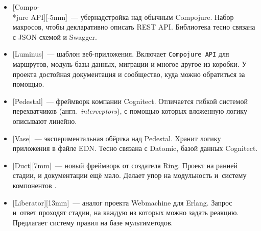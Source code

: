 \begin{itemize}


\item
  [Compo-\\*jure API][-5mm]~---
  убернадстройка над обычным Compojure. Набор макросов, чтобы декларативно описать REST
  API. Библиотека тесно связана с JSON-схемой и Swagger.


\item
  [Luminus]~--- шаблон
  веб-приложения. Включает \texttt{Compojure API} для маршрутов, модуль базы
  данных, миграции и многое другое из коробки. У проекта достойная документация
  и сообщество, куда можно обратиться за помощью.


\item
  [Pedestal]~--- фреймворк
  компании Cognitect. Отличается гибкой системой перехватчиков
  (англ.~\emph{interceptors}), с помощью которых вложенную логику описывают
  линейно.


\item
  [Vase]~---
  экспериментальная обёртка над Pedestal. Хранит логику приложения в файле
  EDN. Тесно связана с Datomic, базой данных Cognitect.


\item
  [Duct][7mm]~--- новый
  фреймворк от создателя Ring. Проект на ранней стадии, и документации ещё
  мало. Делает упор на модульность и~систему компонентов .


\item
  [Liberator][13mm]~---
  аналог проекта Webmachine для Erlang. Запрос и~ответ проходят стадии, на
  каждую из которых можно задать реакцию. Предлагает систему правил на базе
  мультиметодов.

\end{itemize}

